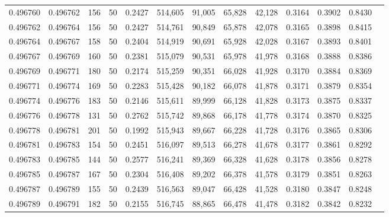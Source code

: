 \begin{tabular}{rrrrrrrrrrrrr}
0.496760 & 0.496762 &   156 &  50 &                                     0.2427 & 514,605 &  91,005 &  65,828 &  42,128 & 0.3164 & 0.3902 & 0.8430 \\
0.496762 & 0.496764 &   156 &  50 &                                     0.2427 & 514,761 &  90,849 &  65,878 &  42,078 & 0.3165 & 0.3898 & 0.8415 \\
0.496764 & 0.496767 &   158 &  50 &                                     0.2404 & 514,919 &  90,691 &  65,928 &  42,028 & 0.3167 & 0.3893 & 0.8401 \\
0.496767 & 0.496769 &   160 &  50 &                                     0.2381 & 515,079 &  90,531 &  65,978 &  41,978 & 0.3168 & 0.3888 & 0.8386 \\
0.496769 & 0.496771 &   180 &  50 &                                     0.2174 & 515,259 &  90,351 &  66,028 &  41,928 & 0.3170 & 0.3884 & 0.8369 \\
0.496771 & 0.496774 &   169 &  50 &                                     0.2283 & 515,428 &  90,182 &  66,078 &  41,878 & 0.3171 & 0.3879 & 0.8354 \\
0.496774 & 0.496776 &   183 &  50 &                                     0.2146 & 515,611 &  89,999 &  66,128 &  41,828 & 0.3173 & 0.3875 & 0.8337 \\
0.496776 & 0.496778 &   131 &  50 &                                     0.2762 & 515,742 &  89,868 &  66,178 &  41,778 & 0.3174 & 0.3870 & 0.8325 \\
0.496778 & 0.496781 &   201 &  50 &                                     0.1992 & 515,943 &  89,667 &  66,228 &  41,728 & 0.3176 & 0.3865 & 0.8306 \\
0.496781 & 0.496783 &   154 &  50 &                                     0.2451 & 516,097 &  89,513 &  66,278 &  41,678 & 0.3177 & 0.3861 & 0.8292 \\
0.496783 & 0.496785 &   144 &  50 &                                     0.2577 & 516,241 &  89,369 &  66,328 &  41,628 & 0.3178 & 0.3856 & 0.8278 \\
0.496785 & 0.496787 &   167 &  50 &                                     0.2304 & 516,408 &  89,202 &  66,378 &  41,578 & 0.3179 & 0.3851 & 0.8263 \\
0.496787 & 0.496789 &   155 &  50 &                                     0.2439 & 516,563 &  89,047 &  66,428 &  41,528 & 0.3180 & 0.3847 & 0.8248 \\
0.496789 & 0.496791 &   182 &  50 &                                     0.2155 & 516,745 &  88,865 &  66,478 &  41,478 & 0.3182 & 0.3842 & 0.8232 \\

\end{tabular}
